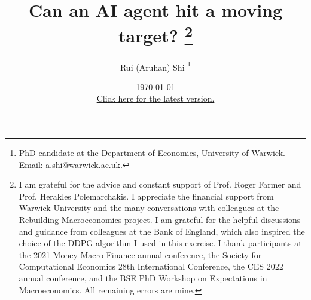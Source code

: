 \documentclass[hidelinks]{article}
\begin{document}
	
\title{Can an AI agent hit a moving target? 
	\thanks{I am grateful for the advice and constant support of Prof. Roger Farmer and Prof. Herakles Polemarchakis.  I appreciate the financial support from Warwick University and the many conversations with colleagues at the Rebuilding Macroeconomics project. I am grateful for the helpful discussions and guidance from colleagues at the Bank of England, which also inspired the choice of the DDPG algorithm I used in this exercise. I thank participants at the 2021 Money Macro Finance annual conference, the Society for Computational Economics 28th International Conference, the CES 2022 annual conference, and the BSE PhD Workshop on Expectations in Macroeconomics. All remaining errors are mine.}
}

\author{\large Rui (Aruhan) Shi \thanks{PhD candidate at the Department of Economics,
		University of Warwick. Email: \href{mailto:a.shi@warwick.ac.uk}{a.shi@warwick.ac.uk}.}
		
}




\date{\today\\ \href{https://warwick.ac.uk/fac/soc/economics/staff/rshi/jmp.pdf}{Click here for the latest version.}
} 



\maketitle

\thispagestyle{empty}
\end{document}
